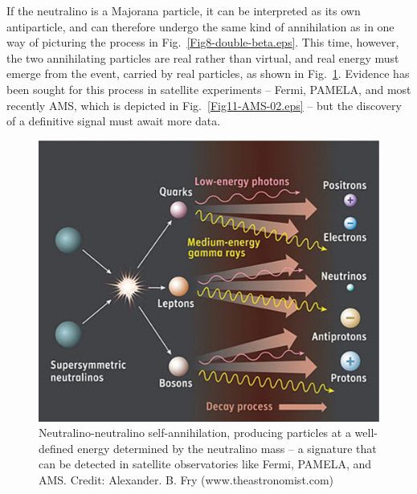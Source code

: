 \documentclass[12pt]{iopart}
\begin{document}
If the neutralino is a Majorana particle, it can be interpreted as its own antiparticle, and can therefore undergo the same kind of annihilation as in one way of picturing the process in Fig.~\ref{Fig8-double-beta.eps}. This time, however, the two annihilating particles are real rather than virtual, and real energy must emerge from the event, carried by real particles, as shown in Fig.~\ref{Fig10-neutralino.eps}. Evidence has been sought for this process in satellite experiments -- Fermi, PAMELA, and most recently AMS, which is depicted in Fig.~\ref{Fig11-AMS-02.eps} -- but the discovery of a definitive signal must await more data.
\begin{figure}[htbp]
\centering
 \includegraphics[bb=0 0 360 300, width=5in]{Fig10-neutralino.eps}
\caption{Neutralino-neutralino self-annihilation, producing particles at a well-defined energy determined by the neutralino mass --  a signature that can be detected in satellite observatories like Fermi, PAMELA, and AMS. Credit: Alexander. B. Fry (www.theastronomist.com) \label{Fig10-neutralino.eps}}
\end{figure}
\end{document}
